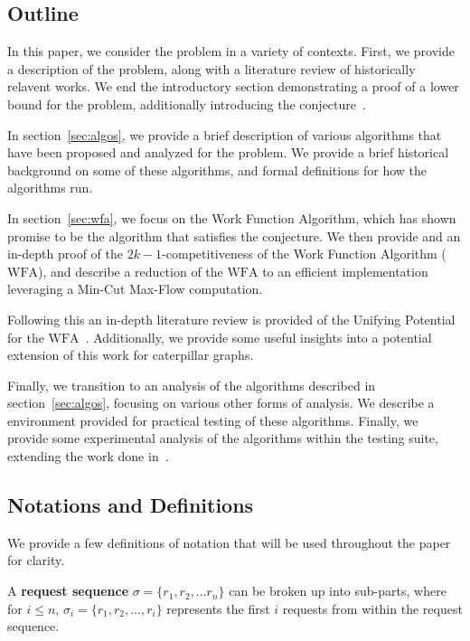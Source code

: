 \subsection{Outline}
\label{sec:out}
In this paper, we consider the \KS problem in a variety of contexts. First, we provide a description of the \KS problem, along with a literature review of historically relavent works. We end the introductory section demonstrating a proof of a lower bound for the problem, additionally introducing the \KS conjecture~\cite{KS1988}. 

In section~\ref{sec:algos}, we provide a brief description of various algorithms that have been proposed and analyzed for the \KS problem. We provide a brief historical background on some of these algorithms, and formal definitions for how the algorithms run.

In section~\ref{sec:wfa}, we focus on the Work Function Algorithm, which has shown promise to be the algorithm that satisfies the \KS conjecture. We then provide and an in-depth proof of the $2k-1$-competitiveness of the Work Function Algorithm ($\mathrm{WFA}$), and describe a reduction of the $\mathrm{WFA}$ to an efficient implementation leveraging a Min-Cut Max-Flow computation.

Following this an in-depth literature review is provided of the Unifying Potential for the $\mathrm{WFA}$~\cite{unifyingPotential2021}. Additionally, we provide some useful insights into a potential extension of this work for caterpillar graphs. 

Finally, we transition to an analysis of the algorithms described in section~\ref{sec:algos}, focusing on various other forms of analysis. We describe a \CC environment provided for practical testing of these algorithms. Finally, we provide some experimental analysis of the algorithms within the testing suite, extending the work done in~\cite{independantStudy2023}.

\subsection{Notations and Definitions}

We provide a few definitions of notation that will be used throughout the paper for clarity.

\begin{definition}
    A \textbf{request sequence} $\sigma = \{ r_1, r_2, ... r_n\}$ can be broken up into sub-parts, where for $i \leq n$, $\sigma_i = \{ r_1, r_2, ..., r_i\}$ represents the first $i$ requests from within the request sequence.
\end{definition}

